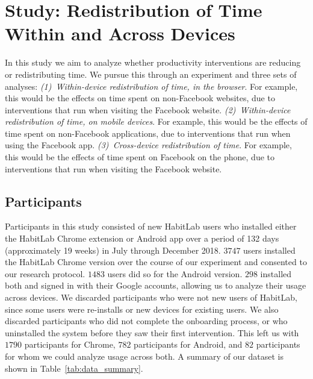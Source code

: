 \section{Study: Redistribution of Time Within and Across Devices}

In this study we aim to analyze whether productivity interventions are reducing or redistributing time. We pursue this through an experiment and three sets of analyses:  \textit{(1)~Within-device redistribution of time, in the browser}. For example, this would be the effects on time spent on non-Facebook websites, due to interventions that run when visiting the Facebook website. \textit{(2)~Within-device redistribution of time, on mobile devices}. For example, this would be the effects of time spent on non-Facebook applications, due to interventions that run when using the Facebook app. \textit{(3)~Cross-device redistribution of time}. For example, this would be the effects of time spent on Facebook on the phone, due to interventions that run when visiting the Facebook website.

\subsection{Participants}

Participants in this study consisted of new HabitLab users who installed either the HabitLab Chrome extension or Android app over a period of 132 days (approximately 19 weeks) in July through December 2018. $3747$ users installed the HabitLab Chrome version over the course of our experiment and consented to our research protocol. $1483$ users did so for the Android version. $298$ installed both and signed in with their Google accounts, allowing us to analyze their usage across devices. We discarded participants who were not new users of HabitLab, since some users were re-installs or new devices for existing users. We also discarded participants who did not complete the onboarding process, or who uninstalled the system before they saw their first intervention. This left us with $1790$ participants for Chrome, $782$ participants for Android, and $82$ participants for whom we could analyze usage across both. A summary of our dataset is shown in Table~\ref{tab:data_summary}.

